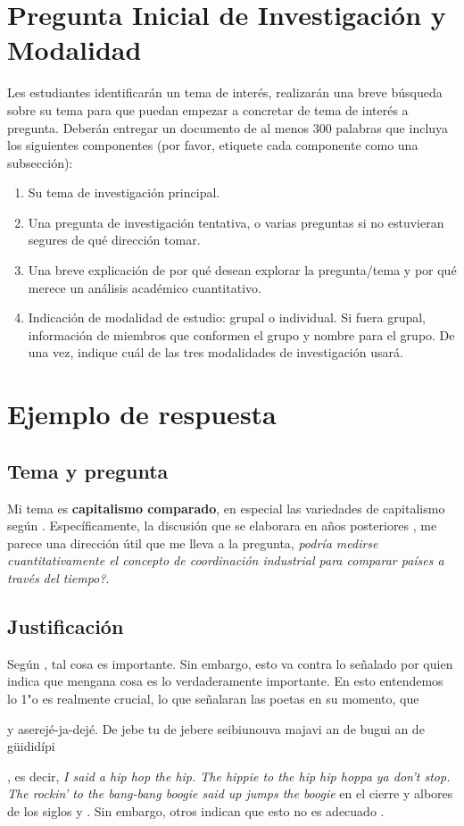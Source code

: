 \documentclass[11pt]{article}
\begin{document}
\newpage

\section*{Pregunta Inicial de Investigación y Modalidad}
Les estudiantes identificarán un tema de interés, realizarán una breve búsqueda sobre su tema para que puedan empezar a concretar de tema de interés a pregunta. Deberán entregar un documento de al menos 300 palabras que incluya los siguientes componentes (por favor, etiquete cada componente como una subsección):
\begin{enumerate}
    \item Su tema de investigación principal.
    \item Una pregunta de investigación tentativa, o varias preguntas si no estuvieran segures de qué dirección tomar.
    \item Una breve explicación de por qué desean explorar la pregunta/tema y por qué merece un análisis académico cuantitativo.
    \item Indicación de modalidad de estudio: grupal o individual. Si fuera grupal, información de miembros que conformen el grupo y nombre para el grupo. De una vez, indique cuál de las tres modalidades de investigación usará.
\end{enumerate}

\section{Ejemplo de respuesta}

\subsection{Tema y pregunta}
Mi tema es \textbf{capitalismo comparado}, en especial las variedades de capitalismo seg\'un \citet{hall2001introduction}. Espec\'ificamente, la discusi\'on que se elaborara en a\~nos posteriores \citep{hall2009institutional}, me parece una direcci\'on \'util que me lleva a la pregunta, \textit{podría medirse cuantitativamente el concepto de coordinaci\'on industrial para comparar países a través del tiempo?}.

\subsection{Justificación}
Según \citet{giovannetti2015}, tal cosa es importante. Sin embargo, esto va contra lo señalado por \citet{lopezroman2012} quien indica que mengana cosa es lo verdaderamente importante. En esto entendemos lo 1"o es realmente crucial, lo que señalaran las poetas en su momento, que \begin{quoting}y aserejé-ja-dejé. De jebe tu de jebere seibiunouva majavi an de bugui an de güididípi\end{quoting}, es decir, \textit{I said a hip hop the hip. The hippie to the hip hip hoppa ya don’t stop. The rockin’ to the bang-bang boogie said up jumps the boogie} en el cierre y albores de los siglos  y  \citep{Hails2022}. Sin embargo, otros indican que esto no es adecuado \citep{nunn2011slave}.
\end{document}
